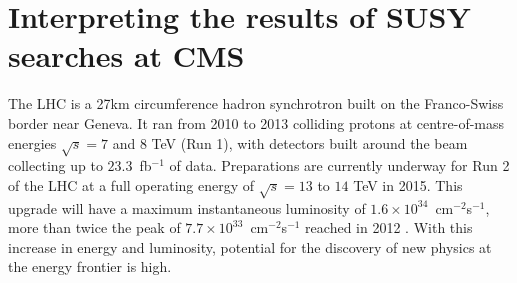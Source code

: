 
\section{Interpreting the results of SUSY searches at CMS}
\label{sec:susyModels}



The LHC is a 27km circumference hadron synchrotron built on the Franco-Swiss border \cite{LHCMachine} near Geneva. It ran from 2010 to 2013 colliding protons at centre-of-mass energies $\sqrt{s}=7$ and $8$ TeV (Run 1), with detectors built around the beam collecting up to $23.3$~fb$^{-1}$ of data. Preparations are currently underway for Run 2 of the LHC at a full operating energy of $\sqrt{s}=13$ to $14$ TeV in 2015. This upgrade will have a maximum instantaneous luminosity of $1.6\times10^{34}$~cm$^{-2}$s$^{-1}$, more than twice the peak of $7.7\times10^{33}$~cm$^{-2}$s$^{-1}$ reached in 2012 \cite{LHCLuminosityIPAC13}. With this increase in energy and luminosity, potential for the discovery of new physics at the energy frontier is high.  
\\\\
